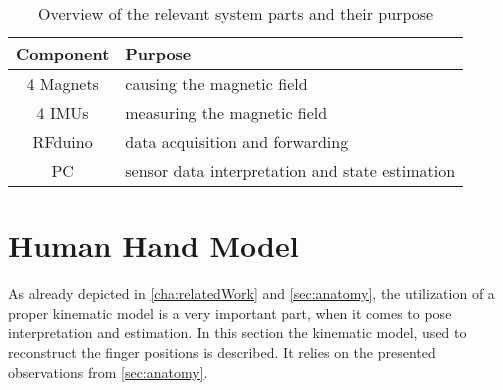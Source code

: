 \begin{table}[h]
\centering
\begin{tabular}{c|l}
\textbf{Component} & \textbf{Purpose} \\ \hline
4 Magnets & causing the magnetic field \\ \hline
4 \acp{IMU} & measuring the magnetic field \\ \hline
RFduino & data acquisition and forwarding \\ \hline
PC & sensor data interpretation and state estimation \\ %
\end{tabular}
\caption[List of system parts]{Overview of the relevant system parts and their purpose}
\label{tab:systemParts}
\end{table}



\section{Human Hand Model} \label{sec:handModel}

As already depicted in \ref{cha:relatedWork} and \ref{sec:anatomy}, the utilization of a proper kinematic model is a very important part, when it comes to pose interpretation and estimation. In this section the kinematic model, used to reconstruct the finger positions is described. It relies on the presented observations from \ref{sec:anatomy}.


